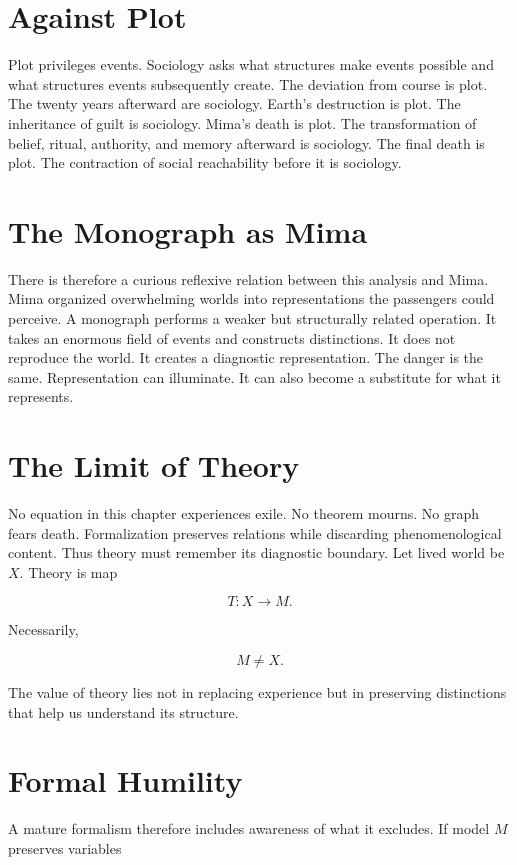\documentclass[11pt,oneside]{book}
\theoremstyle{definition}
\theoremstyle{remark}
\begin{document}
\section{Against Plot}

Plot privileges events. Sociology asks what structures make events possible and what structures
events subsequently create. The deviation from course is plot. The twenty years afterward are
sociology. Earth's destruction is plot. The inheritance of guilt is sociology. Mima's death is plot.
The transformation of belief, ritual, authority, and memory afterward is sociology. The final death
is plot. The contraction of social reachability before it is sociology.

\section{The Monograph as Mima}

There is therefore a curious reflexive relation between this analysis and Mima. Mima organized
overwhelming worlds into representations the passengers could perceive. A monograph performs a
weaker but structurally related operation. It takes an enormous field of events and constructs
distinctions. It does not reproduce the world. It creates a diagnostic representation. The danger is
the same. Representation can illuminate. It can also become a substitute for what it represents.

\section{The Limit of Theory}

No equation in this chapter experiences exile. No theorem mourns. No graph fears death.
Formalization preserves relations while discarding phenomenological content. Thus theory must
remember its diagnostic boundary. Let lived world be \(X\). Theory is map

\[
T:X\rightarrow M.
\]

Necessarily,

\[
M\neq X.
\]

The value of theory lies not in replacing experience but in preserving distinctions that help us
understand its structure.

\section{Formal Humility}

A mature formalism therefore includes awareness of what it excludes. If model \(M\) preserves
variables
\end{document}
